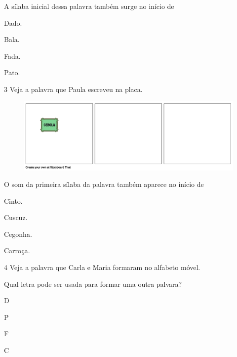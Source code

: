 
A sílaba inicial dessa palavra também surge no início de

\begin{escolha}
\item Dado.

\item Bala.

\item Fada.

\item Pato.
\end{escolha}

\num{3} Veja a palavra que Paula escreveu na placa.

\begin{figure}[htpb!]
\centering
\includegraphics[width=.5\textwidth]{media/image176.png}
\end{figure}


O som da primeira sílaba da palavra também aparece no início de

\begin{escolha}
\item Cinto.

\item Cuscuz.

\item Cegonha.

\item Carroça.
\end{escolha}


\num{4} Veja a palavra que Carla e Maria formaram no alfabeto móvel.

Qual letra pode ser usada para formar uma outra palvara?

\begin{escolha}
\item D

\item P

\item F

\item C
\end{escolha}

